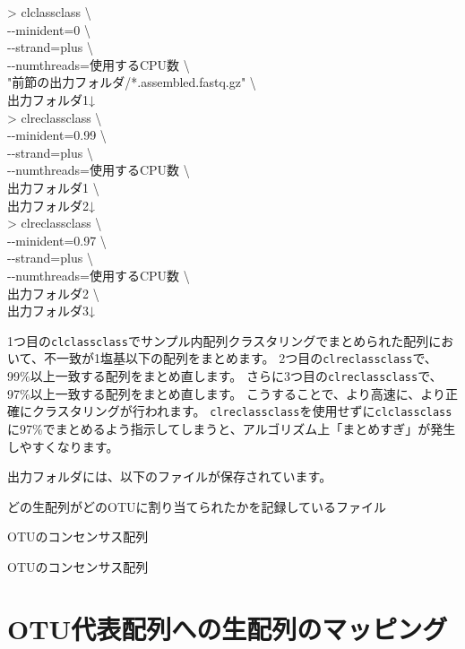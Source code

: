 \documentclass[titlepage,10pt,a4paper]{jsbook}
\newenvironment{cmd}{\begin{oframed}\raggedright\ttfamily\footnotesize\setlength{\baselineskip}{1.4em}}{\end{oframed}\vspace{-1em}}
\begin{document}
\begin{cmd}
{\textgreater} clclassclass {\textbackslash}\\
{-}{-}minident=0 {\textbackslash}\\
{-}{-}strand=plus {\textbackslash}\\
{-}{-}numthreads=使用するCPU数 {\textbackslash}\\
"前節の出力フォルダ/*.assembled.fastq.gz" {\textbackslash}\\
出力フォルダ1↓\\
{\textgreater} clreclassclass {\textbackslash}\\
{-}{-}minident=0.99 {\textbackslash}\\
{-}{-}strand=plus {\textbackslash}\\
{-}{-}numthreads=使用するCPU数 {\textbackslash}\\
出力フォルダ1 {\textbackslash}\\
出力フォルダ2↓\\
{\textgreater} clreclassclass {\textbackslash}\\
{-}{-}minident=0.97 {\textbackslash}\\
{-}{-}strand=plus {\textbackslash}\\
{-}{-}numthreads=使用するCPU数 {\textbackslash}\\
出力フォルダ2 {\textbackslash}\\
出力フォルダ3↓
\end{cmd}
1つ目の\texttt{clclassclass}でサンプル内配列クラスタリングでまとめられた配列において、不一致が1塩基以下の配列をまとめます。
2つ目の\texttt{clreclassclass}で、99\%以上一致する配列をまとめ直します。
さらに3つ目の\texttt{clreclassclass}で、97\%以上一致する配列をまとめ直します。
こうすることで、より高速に、より正確にクラスタリングが行われます。
\texttt{clreclassclass}を使用せずに\texttt{clclassclass}に97\%でまとめるよう指示してしまうと、アルゴリズム上「まとめすぎ」が発生しやすくなります。

出力フォルダには、以下のファイルが保存されています。
\begin{description}\small\setlength{\baselineskip}{1.1em}
\item[assembled.contigmembers.gz] どの生配列がどのOTUに割り当てられたかを記録しているファイル
\item[assembled.fastq.gz] OTUのコンセンサス配列
\item[assembled.fasta] OTUのコンセンサス配列
\end{description}

\section{OTU代表配列への生配列のマッピング}
\end{document}
